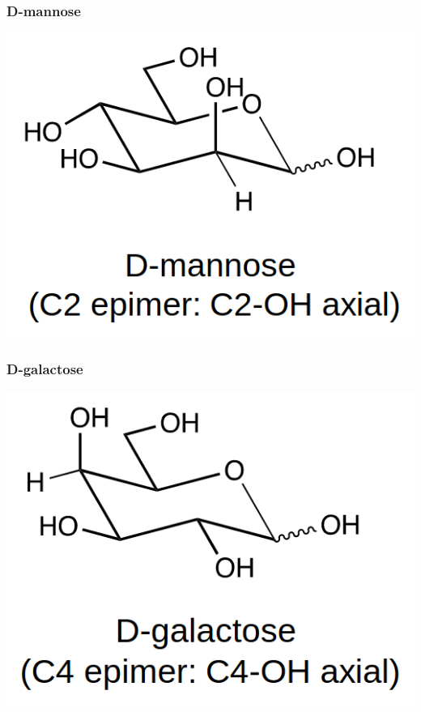 \documentclass[11pt]{article}
\begin{document}
\subsubsection{D-mannose}
\label{sec:org64214b0}

\begin{center}
\includegraphics[scale=1.0]{./images/d-mannose.png}
\end{center}
\subsubsection{D-galactose}
\label{sec:org36d06e0}

\begin{center}
\includegraphics[scale=1.0]{./images/d-galactose.png}
\end{center}
\end{document}
